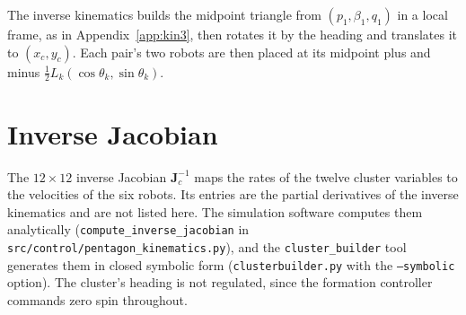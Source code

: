 The inverse kinematics builds the midpoint triangle from
$(p_1, \beta_1, q_1)$ in a local frame, as in
Appendix~\ref{app:kin3}, then rotates it by the heading and translates it
to $(x_c, y_c)$. Each pair's two robots are then placed at its midpoint
plus and minus $\tfrac{1}{2}L_k(\cos\theta_k, \sin\theta_k)$.

\section{Inverse Jacobian}
\label{sec:appC:jacobian}

The $12 \times 12$ inverse Jacobian $\mathbf{J}_c^{-1}$ maps the rates of
the twelve cluster variables to the velocities of the six robots. Its
entries are the partial derivatives of the inverse kinematics and are not
listed here. The simulation software computes them analytically
(\texttt{compute\_inverse\_jacobian} in
\texttt{src/control/pentagon\_kinematics.py}), and the
\texttt{cluster\_builder} tool generates them in closed symbolic form
(\texttt{clusterbuilder.py} with the \texttt{--symbolic} option). The
cluster's heading is not regulated, since the formation controller
commands zero spin throughout.
